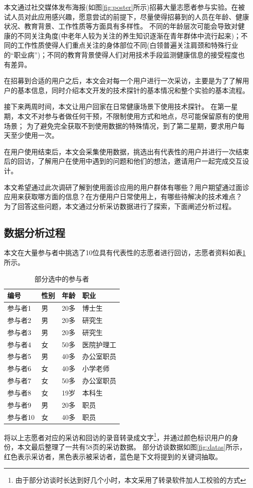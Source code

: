 本文通过社交媒体发布海报(如图\ref{fig:poster}所示)招募大量志愿者参与实验。在被试人员对此应用感兴趣，愿意尝试的前提下，尽量使得招募到的人员在年龄、健康状况、教育背景、工作性质等方面具有多样性。
不同的年龄层次可能会导致对健康的不同关注角度(中老年人较为关注的养生知识逐渐在青年群体中流行起来)；不同的工作性质使得人们重点关注的身体部位不同(白领普遍关注肩颈和特殊行业的“职业病”)；不同的教育背景使得人们对用技术手段监测健康信息的接受程度也有差异。

在招募到合适的用户之后，本文会对每一个用户进行一次采访，主要是为了了解用户的基本信息，同时介绍本文开发的技术探针的基本情况和整个实验的基本流程。

接下来两周时间，本文让用户回家在日常健康场景下使用技术探针。
在第一星期，本文不对参与者做任何干预，不限制使用方式和地点，尽可能保留原有的使用场景；
为了避免完全获取不到使用数据的特殊情况，到了第二星期，要求用户每天至少使用一次。

在用户使用结束后，本文会采集使用数据，挑选出有代表性的用户并进行一次结束后的回访，了解用户在使用中遇到的问题和他们的想法，邀请用户一起完成交互设计。


本文希望通过此次调研了解到使用面诊应用的用户群体有哪些？用户期望通过面诊应用来获取哪方面的信息？在方便用户日常使用上，有哪些待解决的技术难点？
为了回答这些问题，本文通过分析采访数据进行了探索，下面阐述分析过程。


\subsection{数据分析过程}

本文在大量参与者中挑选了10位具有代表性的志愿者进行回访，志愿者资料如表\ref{tab:part}所示。
\begin{table}[htb]
    \centering
    \caption{部分选中的参与者}
    \begin{tabular}{llll}
          \toprule
          编号 &	性别 &	年龄 &	职业 \\
          \midrule
          参与者1 &	男 &	20多 &	博士生 \\
          参与者2 &	男 &	20多 &	研究生 \\
          参与者3 &	男 &	20多 &	研究生 \\
          参与者4 &	女 &	50多 &	医院护理工 \\
          参与者5 &	男 &	40多 &	办公室职员 \\
          参与者6 &	女 &	40多 &	小学老师 \\
          参与者7 &	女 &	50多 &	办公室职员 \\
          参与者8 &	女 &	19岁 &	本科生 \\
          参与者9 &	男 &	20多 &	职员 \\
          参与者10 &	女 &	40多 &	职员 \\
          \bottomrule
    \end{tabular}
    \label{tab:part}
\end{table}
将以上志愿者对应的采访和回访的录音转录成文字\footnote{由于部分访谈时长达到好几个小时，本文采用了转录软件加人工校验的方式}，并通过颜色标识用户的身份，本文最后整理了一共有58页的采访数据。
部分访谈数据如图\ref{fig:datas}所示，红色表示采访者，黑色表示被采访者，蓝色是下文将提到的关键词抽取。

